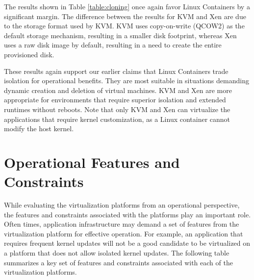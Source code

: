 The results shown in Table \ref{table:cloning} once again favor Linux Containers by a significant margin. The difference between the results for KVM and Xen are due to the storage format used by KVM. KVM uses copy-on-write (QCOW2) as the default storage mechanism, resulting in a smaller disk footprint, whereas Xen uses a raw disk image by default, resulting in a need to create the entire provisioned disk.

These results again support our earlier claims that Linux Containers trade isolation for operational benefits. They are most suitable in situations demanding dynamic creation and deletion of virtual machines. KVM and Xen are more appropriate for environments that require superior isolation and extended runtimes without reboots. Note that only KVM and Xen can virtualize the applications that require kernel customization, as a Linux container cannot modify the host kernel. 





\section{Operational Features and Constraints}

While evaluating the virtualization platforms from an operational perspective, the features and constraints associated with the platforms play an important role. Often times, application infrastructure may demand a set of features from the virtualization platform for effective operation. For example, an application that requires frequent kernel updates will not be a good candidate to be virtualized on a platform that does not allow isolated kernel updates. The following table summarizes a key set of features and constraints associated with each of the virtualization platforms. 


